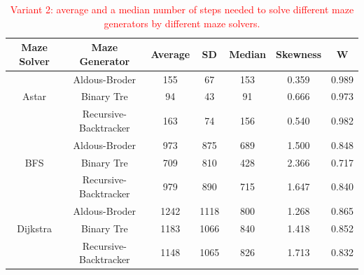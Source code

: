 \begin{table}[!ht]
    \centering
    \caption{\textcolor{red}{Variant 2: average and a median number of steps needed to solve different maze generators by different maze solvers.}}
    \begin{tabular}{c c c c c c c}
    \hline
        Maze Solver & Maze Generator & Average & SD & Median & Skewness & W\\ \hline
        ~ & Aldous-Broder & 155 & 67 & 153 & 0.359 & 0.989\\ 
        Astar & Binary Tre & 94 & 43 & 91 & 0.666 & 0.973 \\ 
        ~ & Recursive-Backtracker & 163 & 74 & 156 & 0.540 & 0.982\\ \hline
        ~ & Aldous-Broder & 973 & 875 & 689 & 1.500 & 0.848 \\ 
        BFS & Binary Tre & 709 & 810 & 428 & 2.366 & 0.717 \\ 
        ~ & Recursive-Backtracker & 979 & 890 & 715 & 1.647 & 0.840 \\ \hline
        ~ & Aldous-Broder & 1242 & 1118 & 800 & 1.268 & 0.865\\ 
        Dijkstra & Binary Tre & 1183 & 1066 & 840 & 1.418 & 0.852\\ 
        ~ & Recursive-Backtracker & 1148 & 1065 & 826 & 1.713 & 0.832\\ \hline
    \end{tabular}
\end{table}    
